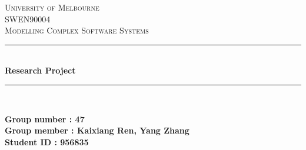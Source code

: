 \lstset{style=mystyle}


	
\doublespacing

\begin{titlepage}

\newcommand{\HRule}{\rule{\linewidth}{0.5mm}} %

\center %
 

\textsc{\LARGE University of Melbourne}\\[1.5cm] %
\textsc{\Large SWEN90004}\\[0.5cm] %
\textsc{\large Modelling Complex Software Systems}\\[0.5cm] %


\HRule \\[0.4cm]
{ \huge \bfseries Research Project}\\[0.4cm] %
\HRule \\[1.5cm]


\begin{minipage}{0.4\textwidth}
	\bfseries Group number : 47\\
	\bfseries Group member : Kaixiang Ren, Yang Zhang\\
	\bfseries Student ID : 956835
\end{minipage}\\[2cm]




\end{titlepage}
